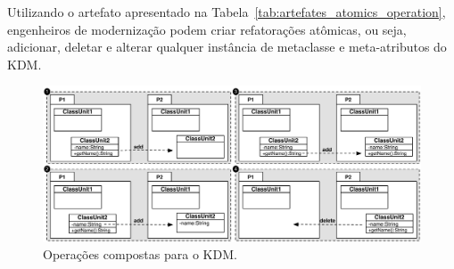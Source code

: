 Utilizando o artefato apresentado na Tabela~\ref{tab:artefates_atomics_operation}, engenheiros de modernização podem criar refatorações atômicas, ou seja, adicionar, deletar e alterar qualquer instância de metaclasse e meta-atributos do KDM. 

\begin{figure}[h]
	\centering
	\caption{Operações compostas para o KDM.}
	\label{fig:operacoes_compostas_figuras}
	\includegraphics[scale=0.63]{images/moveNested}
	\fautor
\end{figure}

